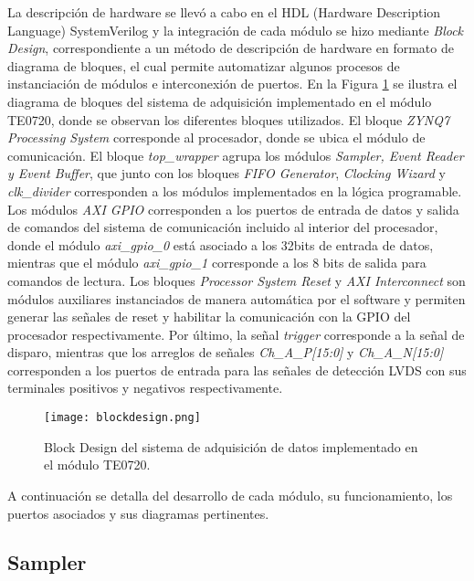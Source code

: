 	La descripción de hardware se llevó a cabo en el HDL (Hardware Description Language) SystemVerilog y la integración de cada módulo se hizo mediante \textit{Block Design}, correspondiente a un método de descripción de hardware en formato de diagrama de bloques, el cual permite automatizar algunos procesos de instanciación de módulos e interconexión de puertos. En la Figura \ref{fig:blockdesign}  se ilustra el diagrama de bloques del sistema de adquisición implementado en el módulo TE0720, donde se observan los diferentes bloques utilizados. El bloque \textit{ZYNQ7 Processing System} corresponde al procesador, donde se ubica el módulo de comunicación. El bloque \textit{top\_wrapper} agrupa los módulos \textit{Sampler, Event Reader y Event Buffer}, que junto con los bloques \textit{FIFO Generator}, \textit{Clocking Wizard} y \textit{clk\_divider} corresponden a los módulos implementados en la lógica programable. Los módulos \textit{AXI GPIO} corresponden a los puertos de entrada de datos y salida de comandos del sistema de comunicación incluido al interior del procesador, donde el módulo \textit{axi\_gpio\_0} está asociado a los 32bits de entrada de datos, mientras que el módulo \textit{axi\_gpio\_1} corresponde a los 8 bits de salida para comandos de lectura. Los bloques \textit{Processor System Reset} y \textit{AXI Interconnect} son módulos auxiliares instanciados de manera automática por el software y permiten generar las señales de reset y habilitar la comunicación con la GPIO del procesador respectivamente. Por último, la señal \textit{trigger} corresponde a la señal de disparo, mientras que los arreglos de señales \textit{Ch\_A\_P[15:0]} y \textit{Ch\_A\_N[15:0]} corresponden a los puertos de entrada para las señales de detección LVDS con sus terminales positivos y negativos respectivamente.
	
	\begin{figure}[H]
		\centering
		\texttt{[image: blockdesign.png]}
		\caption{Block Design del sistema de adquisición de datos implementado en el módulo TE0720.}
		\label{fig:blockdesign}
	\end{figure}
	
	A continuación se detalla del desarrollo de cada módulo, su funcionamiento, los puertos asociados y sus diagramas pertinentes. 
	
	\subsection{Sampler}
	\label{sec:sampling}
	
